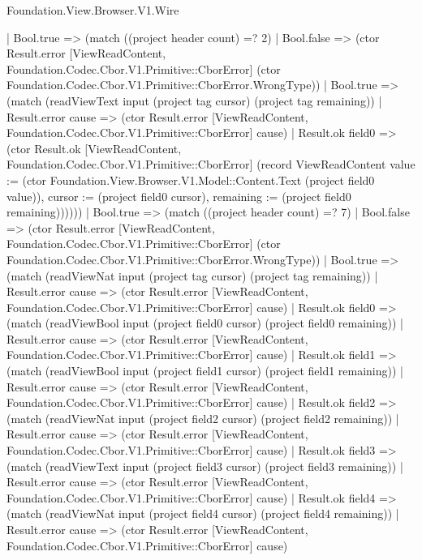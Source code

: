 \begin{lexlean}{Foundation.View.Browser.V1.Wire}
\begin{semanticmodule}
{                        | Bool.true => (match ((project header count) =? 2)
                          | Bool.false => (ctor Result.error [ViewReadContent, Foundation.Codec.Cbor.V1.Primitive::CborError] (ctor Foundation.Codec.Cbor.V1.Primitive::CborError.WrongType))
                          | Bool.true => (match (readViewText input (project tag cursor) (project tag remaining))
                            | Result.error cause => (ctor Result.error [ViewReadContent, Foundation.Codec.Cbor.V1.Primitive::CborError] cause)
                            | Result.ok field0 => (ctor Result.ok [ViewReadContent, Foundation.Codec.Cbor.V1.Primitive::CborError] (record ViewReadContent {value := (ctor Foundation.View.Browser.V1.Model::Content.Text (project field0 value)), cursor := (project field0 cursor), remaining := (project field0 remaining)})))))
                      | Bool.true => (match ((project header count) =? 7)
                        | Bool.false => (ctor Result.error [ViewReadContent, Foundation.Codec.Cbor.V1.Primitive::CborError] (ctor Foundation.Codec.Cbor.V1.Primitive::CborError.WrongType))
                        | Bool.true => (match (readViewNat input (project tag cursor) (project tag remaining))
                          | Result.error cause => (ctor Result.error [ViewReadContent, Foundation.Codec.Cbor.V1.Primitive::CborError] cause)
                          | Result.ok field0 => (match (readViewBool input (project field0 cursor) (project field0 remaining))
                            | Result.error cause => (ctor Result.error [ViewReadContent, Foundation.Codec.Cbor.V1.Primitive::CborError] cause)
                            | Result.ok field1 => (match (readViewBool input (project field1 cursor) (project field1 remaining))
                              | Result.error cause => (ctor Result.error [ViewReadContent, Foundation.Codec.Cbor.V1.Primitive::CborError] cause)
                              | Result.ok field2 => (match (readViewNat input (project field2 cursor) (project field2 remaining))
                                | Result.error cause => (ctor Result.error [ViewReadContent, Foundation.Codec.Cbor.V1.Primitive::CborError] cause)
                                | Result.ok field3 => (match (readViewText input (project field3 cursor) (project field3 remaining))
                                  | Result.error cause => (ctor Result.error [ViewReadContent, Foundation.Codec.Cbor.V1.Primitive::CborError] cause)
                                  | Result.ok field4 => (match (readViewNat input (project field4 cursor) (project field4 remaining))
                                    | Result.error cause => (ctor Result.error [ViewReadContent, Foundation.Codec.Cbor.V1.Primitive::CborError] cause)
}
\end{semanticmodule}
\end{lexlean}
